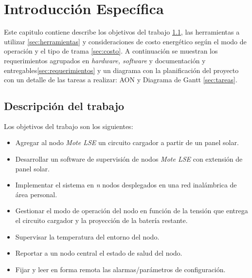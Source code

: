 \chapter{Introducción Específica} %

\label{Chapter2}

Este capitulo contiene describe los objetivos del trabajo \ref{sec:trabajo}, las herramientas a utilizar \ref{sec:herramientas} y consideraciones de costo energético según el modo de operación y el tipo de trama \ref{sec:costo}. A continuación se muestran los requerimientos agrupados en \textit{hardware, software} y documentación y entregables\ref{sec:requerimientos} y un diagrama con la planificación del proyecto con un detalle de las tareas a realizar: AON y Diagrama de Gantt \ref{sec:tareas}.

\section{Descripción del trabajo}
\label{sec:trabajo}
\noindent Los objetivos del trabajo son los siguientes:

\begin{itemize}
	\item Agregar al nodo \textit{Mote LSE} un circuito cargador a partir de un panel solar.
	\item Desarrollar un software de supervisión de nodos \textit{Mote LSE} con extensión de panel solar.
	\item Implementar el sistema en \textit{n} nodos desplegados en una red inalámbrica de área personal.
	\item Gestionar el modo de operación del nodo en función de la tensión que entrega el circuito cargador y la proyección de la batería restante.
	\item Supervisar la temperatura del entorno del nodo.
	\item Reportar a un nodo central el estado de salud del nodo.
	\item Fijar y leer en forma remota las alarmas/parámetros de configuración.
	\end{itemize}

